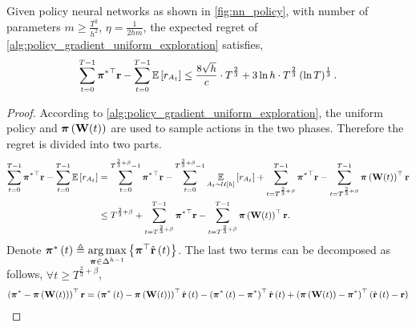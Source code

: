 \begin{thm}
\label{thm:policy_gradient_main_result}
    Given policy neural networks as shown in \cref{fig:nn_policy}, with number of parameters $m \ge \frac{T^2}{h^2}$, $\eta = \frac{1}{2 h m}$, the expected regret of \cref{alg:policy_gradient_uniform_exploration} satisfies,
\begin{equation*}
\small
\begin{split}
    \sum\limits_{t=0}^{T-1}{ {\rvpi^*}^\top \rvr } - \sum\limits_{t=0}^{T-1}{ \sE \left[ r_{A_t} \right] } \le \frac{8 \sqrt{h}}{c} \cdot T^{\frac{2}{3}} + 3 \ln{h} \cdot T^{\frac{2}{3}} \left(\ln{T}\right)^{\frac{1}{3}}.
\end{split}
\end{equation*}
\end{thm}
\begin{proof}
According to \cref{alg:policy_gradient_uniform_exploration}, the uniform policy and ${\boldsymbol{\pi}}\left( {\mathbf{W}}(t) \right)$ are used to sample actions in the two phases. Therefore the regret is divided into two parts.
\begin{equation}
\small
\label{eq:total_regret_decomposition}
\begin{split}
    \sum\limits_{t=0}^{T-1}{ {\rvpi^*}^\top \rvr } - \sum\limits_{t=0}^{T-1}{ \sE \left[ r_{ A_t} \right] } &= \sum\limits_{t=0}^{T^{\frac{2}{3} + \beta} - 1}{ {\rvpi^*}^\top \rvr} - \sum\limits_{t=0}^{T^{\frac{2}{3} + \beta} - 1}{ \expectation\limits_{A_t \sim \gU\left[h\right]}{ \left[ r_{A_t} \right] }} + \sum\limits_{t=T^{\frac{2}{3} + \beta}}^{T-1}{ {\rvpi^*}^\top \rvr }  - \sum\limits_{t=T^{\frac{2}{3} + \beta}}^{T-1}{ \rvpi\left( \rmW(t) \right)^\top \rvr } \\
    &\le T^{\frac{2}{3} + \beta} + \sum\limits_{t=T^{\frac{2}{3} + \beta}}^{T-1}{ {\rvpi^*}^\top \rvr } - \sum\limits_{t=T^{\frac{2}{3} + \beta}}^{T-1}{ \rvpi\left( \rmW(t) \right)^\top \rvr }.
\end{split}
\end{equation}
Denote ${\boldsymbol{\pi}}^*\left(t\right) \triangleq \operatorname*{arg\,max}\limits_{{\boldsymbol{\pi}} \in \Delta^{h-1}}{\left\{ {\boldsymbol{\pi}}^\top \hat{{\mathbf{r}}}\left(t\right)\right\}}$. The last two terms can be decomposed as follows, $\forall t \ge T^{\frac{2}{3} + \beta}$,
\begin{equation}
\small
\label{eq:playing_learning_phase_regret_decomposition}
\begin{split}
    \left( {\rvpi^*} - \rvpi\left( \rmW(t) \right) \right)^\top \rvr &= \left( {\rvpi^*\left(t\right)} - \rvpi\left( \rmW(t) \right) \right)^\top \hat{\rvr}\left(t\right) - \left( {\rvpi^*\left(t\right)} - {\rvpi^*} \right)^\top \hat{\rvr}\left(t\right) + \left( \rvpi\left( \rmW(t) \right) - {\rvpi^*}\right)^\top \left( \hat{\rvr}\left(t\right) - \rvr \right) \\

\end{split}
\end{equation}
\end{proof}
